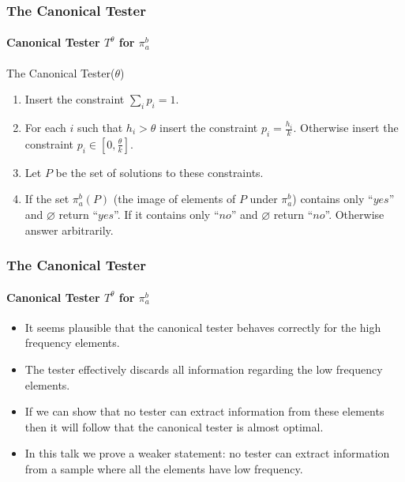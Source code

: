 \documentclass{beamer}
\begin{document}
\begin{frame}
  \frametitle{The Canonical Tester} \framesubtitle{Canonical Tester
    $T^\theta$ for $\pi_a^b$}
  \begin{block}{The Canonical Tester($\theta$)}
    \begin{enumerate}
    \item<2-> Insert the constraint $\sum_ip_i=1$.
    \item<3-> For each $i$ such that $h_i>\theta$ insert the constraint
      $p_i=\frac{h_i}{k}$. Otherwise insert the constraint $p_i\in
      [0,\frac{\theta}{k}]$.
    \item<4-> Let $P$ be the set of solutions to these constraints.
    \item<5-> If the set $\pi_a^b(P)$ (the image of elements of $P$
      under $\pi_a^b$) contains only ``$yes$'' and $\varnothing$ return
      ``$yes$''. If it contains only ``$no$'' and $\varnothing$ return
      ``$no$''. Otherwise answer arbitrarily.
    \end{enumerate}
  \end{block}
\end{frame}
\begin{frame}
  \frametitle{The Canonical Tester} \framesubtitle{Canonical Tester
    $T^\theta$ for $\pi_a^b$}
  \begin{block}{}
    \begin{itemize}
    \item<1-> It seems plausible that the canonical tester behaves
      correctly for the high frequency elements.
    \item<2-> The tester effectively discards all information
      regarding the low frequency elements.
    \item<3-> If we can show that no tester can extract information from
      these elements then it will follow that the canonical tester is
      almost optimal.
    \item<4-> In this talk we prove a weaker statement: no tester can
      extract information from a sample where all the elements have
      low frequency.
    \end{itemize}
  \end{block}
\end{frame}
\end{document}
